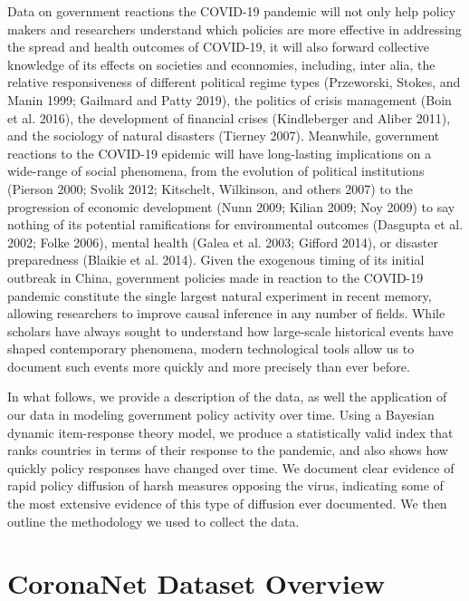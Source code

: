 \documentclass[]{article}
\begin{document}
Data on government reactions the COVID-19 pandemic will not only help policy makers and researchers understand which policies are more effective in addressing the spread and health outcomes of COVID-19, it will also forward collective knowledge of its effects on societies and econnomies, including, inter alia, the relative responsiveness of different political regime types (Przeworski, Stokes, and Manin 1999; Gailmard and Patty 2019), the politics of crisis management (Boin et al. 2016), the development of financial crises (Kindleberger and Aliber 2011), and the sociology of natural disasters (Tierney 2007). Meanwhile, government reactions to the COVID-19 epidemic will have long-lasting implications on a wide-range of social phenomena, from the evolution of political institutions (Pierson 2000; Svolik 2012; Kitschelt, Wilkinson, and others 2007) to the progression of economic development (Nunn 2009; Kilian 2009; Noy 2009) to say nothing of its potential ramifications for environmental outcomes (Dasgupta et al. 2002; Folke 2006), mental health (Galea et al. 2003; Gifford 2014), or disaster preparedness (Blaikie et al. 2014). Given the exogenous timing of its initial outbreak in China, government policies made in reaction to the COVID-19 pandemic constitute the single largest natural experiment in recent memory, allowing researchers to improve causal inference in any number of fields. While scholars have always sought to understand how large-scale historical events have shaped contemporary phenomena, modern technological tools allow us to document such events more quickly and more precisely than ever before.

In what follows, we provide a description of the data, as well the application of our data in modeling government policy activity over time. Using a Bayesian dynamic item-response theory model, we produce a statistically valid index that ranks countries in terms of their response to the pandemic, and also shows how quickly policy responses have changed over time. We document clear evidence of rapid policy diffusion of harsh measures opposing the virus, indicating some of the most extensive evidence of this type of diffusion ever documented. We then outline the methodology we used to collect the data.

\hypertarget{coronanet-dataset-overview}{%
\section{CoronaNet Dataset Overview}\label{coronanet-dataset-overview}}
\end{document}
